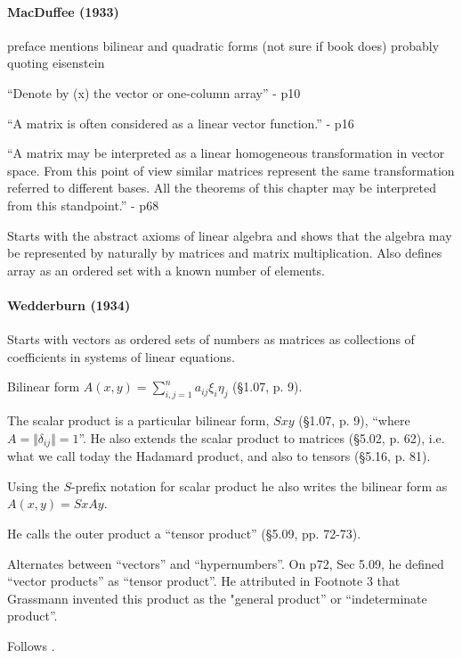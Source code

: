 \paragraph{MacDuffee (1933)~\cite{MacDuffee1933}}

preface mentions bilinear and quadratic forms (not sure if book does)
probably quoting eisenstein

``Denote by (x) the vector or one-column array'' - p10

``A matrix is often considered as a linear vector function.'' - p16

``A matrix may be interpreted as a linear homogeneous transformation in
vector space. From this point of view similar matrices represent the
same transformation referred to different bases. All the theorems of
this chapter may be interpreted from this standpoint.'' - p68

Starts with the abstract axioms of linear algebra and shows that the algebra may be represented by naturally by matrices and matrix multiplication. Also defines array as an ordered set with a known number of elements.

\paragraph{Wedderburn (1934)~\cite{Wedderburn1934}}

Starts with vectors as ordered sets of numbers as matrices as collections of coefficients in systems of linear equations.

Bilinear form $A(x, y) = \sum^n_{i,j=1} a_{ij} \xi_i \eta_j $ (\S 1.07, p. 9).

The scalar product is a particular bilinear form, $S x y$ (\S 1.07, p. 9), ``where $A = \Vert \delta_{ij} \Vert = 1$''. He also extends the scalar product to matrices (\S 5.02, p. 62), i.e. what we call today the Hadamard product, and also to tensors (\S 5.16, p. 81).

Using the $S$-prefix notation for scalar product he also writes the bilinear form as $A(x, y) = SxAy$.

He calls the outer product a ``tensor product'' (\S 5.09, pp. 72-73).

Alternates between ``vectors''
and ``hypernumbers''. On p72, Sec 5.09, he defined ``vector products'' as
``tensor product''. He attributed in Footnote 3 that Grassmann invented
this product as the "general product'' or ``indeterminate product''.

Follows \cite{Scheffers1889}.



